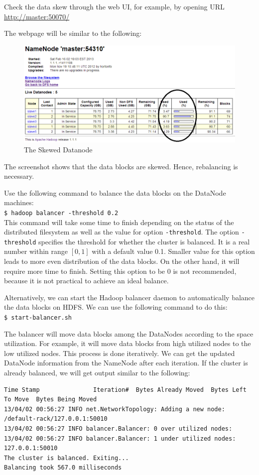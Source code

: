 Check the data skew through the web UI, for example, by opening URL \url{http://master:50070/}

The webpage will be similar to the following:
\begin{figure}[ht]
  \centering
  \includegraphics[width=.8\textwidth]{figs/5163os_07_01.png}
  \caption{The Skewed Datanode}\label{fig:skewed.datanode}
\end{figure} 
The screenshot shows that the data blocks are skewed. Hence, rebalancing is necessary.

Use the following command to balance the data blocks on the DataNode machines: \\
\verb|$ hadoop balancer -threshold 0.2| \\
This command will take some time to finish depending on the status of the distributed filesystem as well as the value for option \verb|-threshold|. The option \verb|-threshold| specifies the threshold for whether the cluster is balanced. It is a real number within range $[0, 1]$ with a default value 0.1. Smaller value for this option leads to more even distribution of the data blocks. On the other hand, it will require more time to finish. Setting this option to be 0 is not recommended, because it is not practical to achieve an ideal balance.

Alternatively, we can start the Hadoop balancer daemon to automatically balance the data blocks on HDFS. We can use the following command to do this: \\
\verb|$ start-balancer.sh|

The balancer will move data blocks among the DataNodes according to the space utilization. For example, it will move data blocks from high utilized nodes to the low utilized nodes. This process is done iteratively. We can get the updated DataNode information from the NameNode after each iteration. If the cluster is already balanced, we will get output similar to the following:
\lstset{style=bashstyle}
\begin{lstlisting}
Time Stamp               Iteration#  Bytes Already Moved  Bytes Left To Move  Bytes Being Moved
13/04/02 00:56:27 INFO net.NetworkTopology: Adding a new node: /default-rack/127.0.0.1:50010
13/04/02 00:56:27 INFO balancer.Balancer: 0 over utilized nodes:
13/04/02 00:56:27 INFO balancer.Balancer: 1 under utilized nodes:  127.0.0.1:50010
The cluster is balanced. Exiting...
Balancing took 567.0 milliseconds
\end{lstlisting}

